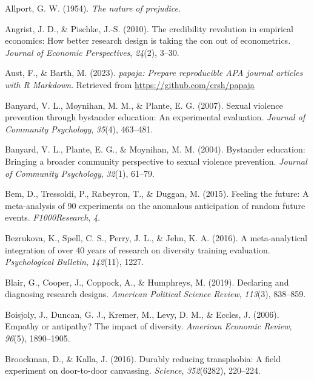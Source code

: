 \documentclass[
  ,jou]{apa6}
\newlength{\cslhangindent}
\newenvironment{CSLReferences}[2] %
 {\begin{list}{}{%
  \setlength{\itemindent}{0pt}
  \setlength{\leftmargin}{0pt}
  \setlength{\parsep}{0pt}
  \ifodd #1
   \setlength{\leftmargin}{\cslhangindent}
   \setlength{\itemindent}{-1\cslhangindent}
  \fi
  \setlength{\itemsep}{#2\baselineskip}}}
 {\end{list}}
\begin{document}
\label{refs}
\begin{CSLReferences}{1}{0}
Allport, G. W. (1954). \emph{The nature of prejudice}.

Angrist, J. D., \& Pischke, J.-S. (2010). The credibility revolution in empirical economics: How better research design is taking the con out of econometrics. \emph{Journal of Economic Perspectives}, \emph{24}(2), 3--30.

Aust, F., \& Barth, M. (2023). \emph{{papaja}: {Prepare} reproducible {APA} journal articles with {R Markdown}}. Retrieved from \url{https://github.com/crsh/papaja}

Banyard, V. L., Moynihan, M. M., \& Plante, E. G. (2007). Sexual violence prevention through bystander education: An experimental evaluation. \emph{Journal of Community Psychology}, \emph{35}(4), 463--481.

Banyard, V. L., Plante, E. G., \& Moynihan, M. M. (2004). Bystander education: Bringing a broader community perspective to sexual violence prevention. \emph{Journal of Community Psychology}, \emph{32}(1), 61--79.

Bem, D., Tressoldi, P., Rabeyron, T., \& Duggan, M. (2015). Feeling the future: A meta-analysis of 90 experiments on the anomalous anticipation of random future events. \emph{F1000Research}, \emph{4}.

Bezrukova, K., Spell, C. S., Perry, J. L., \& Jehn, K. A. (2016). A meta-analytical integration of over 40 years of research on diversity training evaluation. \emph{Psychological Bulletin}, \emph{142}(11), 1227.

Blair, G., Cooper, J., Coppock, A., \& Humphreys, M. (2019). Declaring and diagnosing research designs. \emph{American Political Science Review}, \emph{113}(3), 838--859.

Boisjoly, J., Duncan, G. J., Kremer, M., Levy, D. M., \& Eccles, J. (2006). Empathy or antipathy? The impact of diversity. \emph{American Economic Review}, \emph{96}(5), 1890--1905.

Broockman, D., \& Kalla, J. (2016). Durably reducing transphobia: A field experiment on door-to-door canvassing. \emph{Science}, \emph{352}(6282), 220--224.


\end{CSLReferences}
\end{document}
